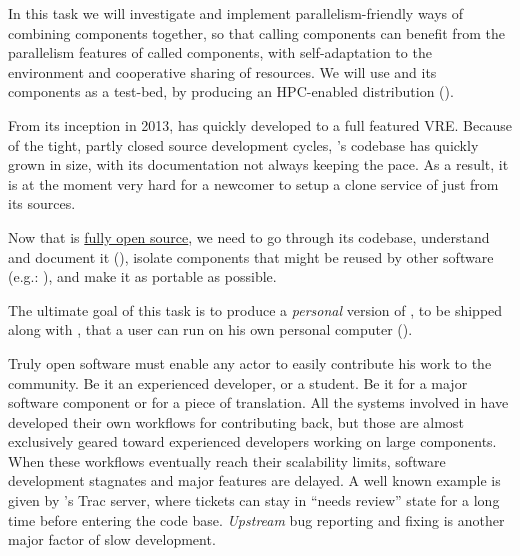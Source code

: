 \begin{workpackage}[id=component-architecture,wphases=0-48!.5,
  title=Component Architecture,lead=UV,
  PSRM=64,UVRM=8,SARM=16, USHRM=4, USORM=6, UBRM=12]
\begin{tasklist}
\begin{task}[title=Component architecture for High Performance Computing and Parallelism,id=component-for-HPC,PM=12]
    In this task we will investigate and implement
    parallelism-friendly ways of combining components together, so
    that calling components can benefit from the parallelism features
    of called components, with self-adaptation to the environment and
    cooperative sharing of resources. We will use \Sage and its
    components as a test-bed, by producing an HPC-enabled distribution
    ().
  \end{task}

  \begin{task}[title=Document and modularize \SMC's codebase,id=extract-smc,lead=PS,PM=10]
    From its inception in 2013, \SMC has quickly developed to a full
    featured VRE.  Because of the tight, partly closed source
    development cycles, \SMC's codebase has quickly grown in size,
    with its documentation not always keeping the pace. As a result,
    it is at the moment very hard for a newcomer to setup a clone
    service of \SMC just from its sources.

    Now that \SMC is
    \href{https://twitter.com/sagemath/status/544939872294014977}{fully
      open source}, we need to go through its codebase, understand and
    document it
    (), isolate
    components that might be reused by other software (e.g.:
    \Jupyter), and make it as portable as possible.

    The ultimate goal of this task is to produce a \emph{personal}
    version of \SMC, to be shipped along with \Sage, that a user can
    run on his own personal computer
    ().
  \end{task}

  \begin{task}[title=Improving the development workflow in mathematical software,id=workflow,lead=UV,PM=4]
    Truly open software must enable any actor to easily contribute his
    work to the community. Be it an experienced developer, or a
    student. Be it for a major software component or for a piece of
    translation. All the systems involved in \TheProject have
    developed their own workflows for contributing back, but those are
    almost exclusively geared toward experienced developers working on
    large components. When these workflows eventually reach their
    scalability limits, software development stagnates and major
    features are delayed. A well known example is given by \Sage's Trac
    server, where tickets can stay in ``needs review'' state for a
    long time before entering the code base.  \emph{Upstream} bug
    reporting and fixing is another major factor of slow development.


\end{task}
\end{tasklist}
\end{workpackage}
